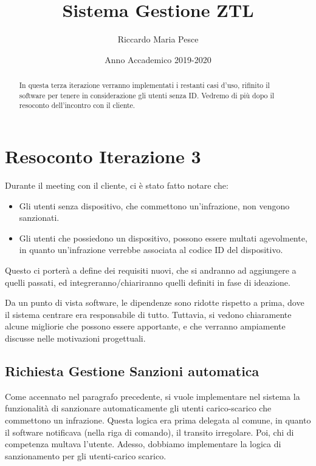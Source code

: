 \documentclass[12pt, letterpaper]{article}
\title{Sistema Gestione ZTL}
\author{Riccardo Maria Pesce}
\date{Anno Accademico 2019-2020}
\begin{document}
\begin{titlepage}

\maketitle

\begin{abstract}

\noindent
In questa terza iterazione verranno implementati i 
restanti casi d'uso, rifinito il software per 
tenere in considerazione gli utenti senza ID.
Vedremo di più dopo il resoconto dell'incontro con 
il cliente.
\end{abstract}
\end{titlepage}

\tableofcontents{}

\pagebreak

\section{Resoconto Iterazione 3}
Durante il meeting con il cliente, ci è stato 
fatto notare che:
\begin{itemize}
    \item Gli utenti senza dispositivo, che commettono 
    un'infrazione, non vengono sanzionati.
    \item Gli utenti che possiedono un dispositivo, possono 
    essere multati agevolmente, in quanto un'infrazione 
    verrebbe associata al codice ID del dispositivo.
\end{itemize}

\noindent
Questo ci porterà a define dei requisiti nuovi, che si andranno
ad aggiungere a quelli passati, ed integreranno/chiariranno 
quelli definiti in fase di ideazione.

\noindent 
Da un punto di vista software, le dipendenze sono ridotte 
rispetto a prima, dove il sistema centrare era responsabile 
di tutto. Tuttavia, si vedono chiaramente alcune migliorie che 
possono essere apportante, e che verranno ampiamente discusse 
nelle motivazioni progettuali.

\subsection{Richiesta Gestione Sanzioni automatica}
Come accennato nel paragrafo precedente, si vuole implementare 
nel sistema la funzionalità di sanzionare automaticamente 
gli utenti carico-scarico che commettono un infrazione.
Questa logica era prima delegata al comune, in quanto il software 
notificava (nella riga di comando), il transito irregolare.
Poi, chi di competenza multava l'utente. Adesso, dobbiamo 
implementare la logica di sanzionamento per gli utenti-carico 
scarico.
\end{document}
